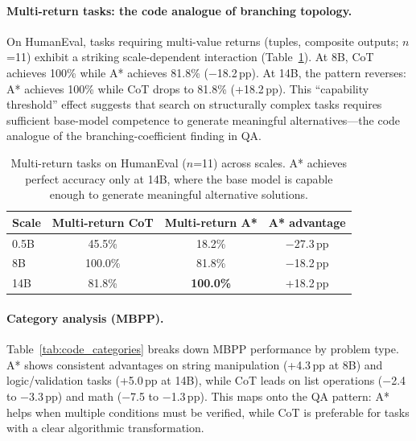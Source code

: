 \documentclass[11pt]{article}
\begin{document}
{{\paragraph{Multi-return tasks: the code analogue of branching topology.}
On HumanEval, tasks requiring multi-value returns (tuples, composite outputs; $n$=11) exhibit a striking scale-dependent interaction (Table~\ref{tab:multi_return}). At 8B, CoT achieves 100\% while A* achieves 81.8\% ($-$18.2\,pp). At 14B, the pattern reverses: A* achieves 100\% while CoT drops to 81.8\% (+18.2\,pp). This ``capability threshold'' effect suggests that search on structurally complex tasks requires sufficient base-model competence to generate meaningful alternatives---the code analogue of the branching-coefficient finding in QA.

\begin{table}[ht]
\centering
\small
\begin{tabular}{lccc}
\toprule
\textbf{Scale} & \textbf{Multi-return CoT} & \textbf{Multi-return A*} & \textbf{A* advantage} \\
\midrule
0.5B  & 45.5\% & 18.2\% & $-$27.3\,pp \\
8B    & 100.0\% & 81.8\% & $-$18.2\,pp \\
14B   & 81.8\% & \textbf{100.0\%} & +18.2\,pp \\
\bottomrule
\end{tabular}
\caption{Multi-return tasks on HumanEval ($n$=11) across scales. A* achieves perfect accuracy only at 14B, where the base model is capable enough to generate meaningful alternative solutions.}
\label{tab:multi_return}
\end{table}

\paragraph{Category analysis (MBPP).}
Table~\ref{tab:code_categories} breaks down MBPP performance by problem type. A* shows consistent advantages on string manipulation (+4.3\,pp at 8B) and logic/validation tasks (+5.0\,pp at 14B), while CoT leads on list operations ($-$2.4 to $-$3.3\,pp) and math ($-$7.5 to $-$1.3\,pp). This maps onto the QA pattern: A* helps when multiple conditions must be verified, while CoT is preferable for tasks with a clear algorithmic transformation.

}}
\end{document}

